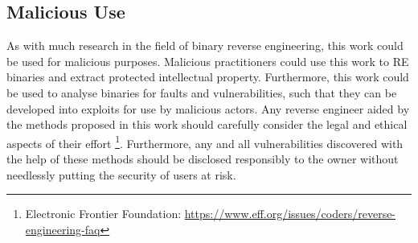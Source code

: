 \subsection{Malicious Use}
As with much research in the field of binary reverse engineering, this work could be used for malicious purposes. Malicious practitioners could use this work to RE binaries and extract protected intellectual property. Furthermore, this work could be used to analyse binaries for faults and vulnerabilities, such that they can be developed into exploits for use by malicious actors. Any reverse engineer aided by the methods proposed in this work should carefully consider the legal and ethical aspects of their effort \footnote{Electronic Frontier Foundation: \url{https://www.eff.org/issues/coders/reverse-engineering-faq}}. Furthermore, any and all vulnerabilities discovered with the help of these methods should be disclosed responsibly to the owner without needlessly putting the security of users at risk. 


